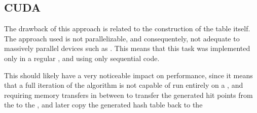 \documentclass[main.tex]{subfiles}
\begin{document}
\subsection{CUDA} \label{section:impl_cuda}


The drawback of this approach is related to the construction of the table itself. The approach used is not parallelizable, and consequentely, not adequate to massively parallel devices such as \gpus. This means that this task was implemented only in a regular \cpu, and using only sequential code.

This should likely have a very noticeable impact on performance, since it means that a full iteration of the algorithm is not capable of run entirely on a \gpu, and requiring memory transfers in between to transfer the generated hit points from the \gpu to the \cpu, and later copy the generated hash table back to the \gpu
\end{document}
